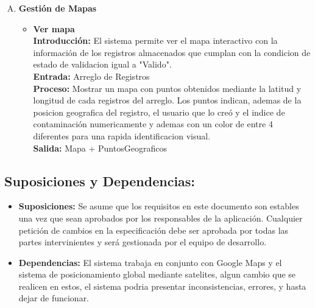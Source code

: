 \begin{enumerate}[A.]
      \item \textbf{Gestión de Mapas}
        \begin{itemize}
          \item \textbf{Ver mapa}
          \\ \textbf{Introducción:} El sistema permite ver el mapa interactivo con la información de los registros almacenados que cumplan con la condicion de estado de validacion igual a "Valido".
          \\ \textbf{Entrada:} Arreglo de Registros 
          \\ \textbf{Proceso:} Mostrar un mapa con puntos obtenidos mediante la latitud y longitud de cada registros del arreglo.
          Los puntos indican, ademas de la posicion geografica del registro, el usuario que lo creó y el indice de contaminación numericamente y ademas con un color de entre 4 diferentes para una rapida identificacion visual.
          \\ \textbf{Salida:} Mapa + PuntosGeograficos
        \end{itemize}

    \end{enumerate}

    \subsection{Suposiciones y Dependencias:}
      \begin{itemize}
        \item \textbf{Suposiciones:} Se asume que los requisitos en este documento son estables una vez que sean aprobados por los responsables de la aplicación. Cualquier petición de cambios en la especificación debe ser aprobada por todas las partes intervinientes y será gestionada por el equipo de desarrollo.
        \item \textbf{Dependencias:} El sistema trabaja en conjunto con Google Maps y el sistema de posicionamiento global mediante satelites, algun cambio que se realicen en estos, el sistema podria presentar inconsistencias, errores, y hasta dejar de funcionar.
      \end{itemize}

